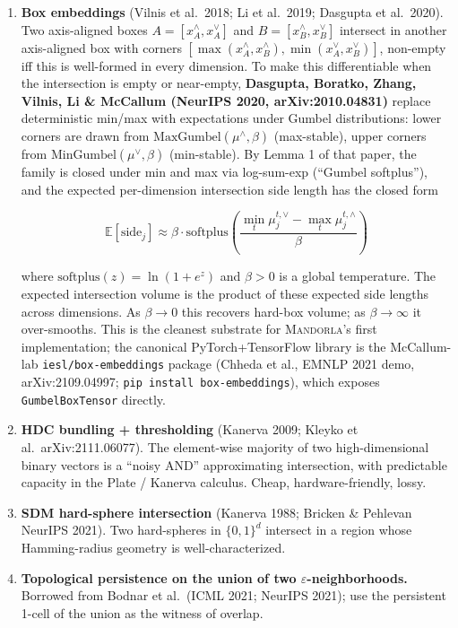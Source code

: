 \documentclass[11pt,a4paper]{article}
\begin{document}
\begin{enumerate}[leftmargin=*]
  \item \textbf{Box embeddings} (Vilnis et al.\ 2018; Li et al.\ 2019; Dasgupta et al.\ 2020). Two axis-aligned boxes $A = [x_A^\wedge, x_A^\vee]$ and $B = [x_B^\wedge, x_B^\vee]$ intersect in another axis-aligned box with corners $[\max(x_A^\wedge, x_B^\wedge), \min(x_A^\vee, x_B^\vee)]$, non-empty iff this is well-formed in every dimension. To make this differentiable when the intersection is empty or near-empty, \textbf{Dasgupta, Boratko, Zhang, Vilnis, Li \& McCallum (NeurIPS 2020, arXiv:2010.04831)} replace deterministic min/max with expectations under Gumbel distributions: lower corners are drawn from $\mathrm{MaxGumbel}(\mu^\wedge, \beta)$ (max-stable), upper corners from $\mathrm{MinGumbel}(\mu^\vee, \beta)$ (min-stable). By Lemma 1 of that paper, the family is closed under min and max via log-sum-exp (``Gumbel softplus''), and the expected per-dimension intersection side length has the closed form

  \[ \mathbb{E}[\mathrm{side}_j] \approx \beta \cdot \mathrm{softplus}\!\left(\frac{\min_t \mu^{t,\vee}_j - \max_t \mu^{t,\wedge}_j}{\beta}\right) \]

  where $\mathrm{softplus}(z) = \ln(1 + e^z)$ and $\beta > 0$ is a global temperature. The expected intersection volume is the product of these expected side lengths across dimensions. As $\beta \to 0$ this recovers hard-box volume; as $\beta \to \infty$ it over-smooths. This is the cleanest substrate for \textsc{Mandorla}'s first implementation; the canonical PyTorch+TensorFlow library is the McCallum-lab \texttt{iesl/box-embeddings} package (Chheda et al., EMNLP 2021 demo, arXiv:2109.04997; \texttt{pip install box-embeddings}), which exposes \texttt{GumbelBoxTensor} directly.
  \item \textbf{HDC bundling + thresholding} (Kanerva 2009; Kleyko et al.\ arXiv:2111.06077). The element-wise majority of two high-dimensional binary vectors is a ``noisy AND'' approximating intersection, with predictable capacity in the Plate / Kanerva calculus. Cheap, hardware-friendly, lossy.
  \item \textbf{SDM hard-sphere intersection} (Kanerva 1988; Bricken \& Pehlevan NeurIPS 2021). Two hard-spheres in $\{0,1\}^d$ intersect in a region whose Hamming-radius geometry is well-characterized.
  \item \textbf{Topological persistence on the union of two $\varepsilon$-neighborhoods.} Borrowed from Bodnar et al.\ (ICML 2021; NeurIPS 2021); use the persistent 1-cell of the union as the witness of overlap.
\end{enumerate}
\end{document}
